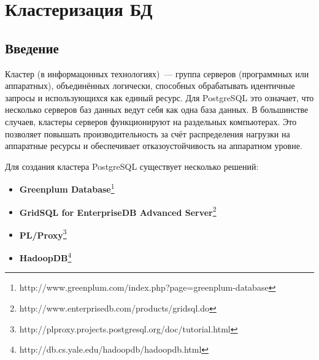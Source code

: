 \chapter{Кластеризация БД}
\begin{epigraphs}
\end{epigraphs}
\section{Введение}
Кластер (в информацонных технологиях)~--- группа серверов (программных или аппаратных), объединённых логически, 
способных обрабатывать идентичные запросы и использующихся как единый ресурс. Для PostgreSQL это означает, что несколько серверов 
баз данных ведут себя как одна база данных. В большинстве случаев, кластеры серверов функционируют на раздельных компьютерах. 
Это позволяет повышать производительность за счёт распределения нагрузки на аппаратные ресурсы и обеспечивает отказоустойчивость 
на аппаратном уровне.

Для создания кластера PostgreSQL существует несколько решений:
\begin{itemize}
\item \textbf{Greenplum Database}\footnote{http://www.greenplum.com/index.php?page=greenplum-database}
\item \textbf{GridSQL for EnterpriseDB Advanced Server}\footnote{http://www.enterprisedb.com/products/gridsql.do}
\item \textbf{PL/Proxy}\footnote{http://plproxy.projects.postgresql.org/doc/tutorial.html}
\item \textbf{HadoopDB}\footnote{http://db.cs.yale.edu/hadoopdb/hadoopdb.html}
\end{itemize}